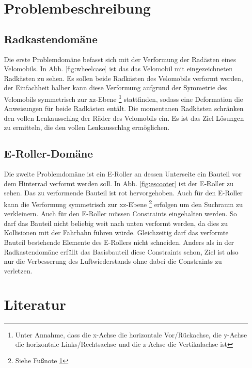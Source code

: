 \documentclass[12pt]{article}
\begin{document}
\section{Problembeschreibung}

\subsection{Radkastendomäne}

Die erste Problemdomäne befasst sich mit der Verformung der Radästen eines Velomobils. 
In Abb. \ref{fig:wheelcase} ist das das Velomobil mit eingezeichneten Radkästen zu sehen.
Es sollen beide Radkästen des Velomobils verformt werden, der Einfachheit halber kann diese Verformung aufgrund der Symmetrie des Velomobils symmetrisch zur xz-Ebene
\footnote{\label{foot:coords} Unter Annahme, dass die x-Achse die horizontale Vor/Rückachse, die y-Achse die horizontale Links/Rechtsachse und die z-Achse die Vertikalachse ist} stattfinden, sodass eine Deformation die Anweisungen für beide Radkästen entält.
Die momentanen Radkästen schränken den vollen Lenkausschlag der Räder des Velomobils ein.
Es ist das Ziel Lösungen zu ermitteln, die den vollen Lenkausschlag ermöglichen.
                      
\subsection{E-Roller-Domäne}

Die zweite Problemdomäne ist ein E-Roller an dessen Unterseite ein Bauteil vor dem Hinterrad verformt werden soll.
In Abb. \ref{fig:escooter} ist der E-Roller zu sehen. Das zu verformende Bauteil ist rot hervorgehoben.
Auch für den E-Roller kann die Verformung symmetrisch zur xz-Ebene \footnote{Siehe Fußnote \ref{foot:coords}} erfolgen um den Suchraum zu verkleinern.
Auch für den E-Roller müssen Constraints eingehalten werden. 
So darf das Bauteil nicht beliebig weit nach unten verformt werden, da dies zu Kollisionen mit der Fahrbahn führen würde.
Gleichzeitig darf das verformte Bauteil bestehende Elemente des E-Rollers nicht schneiden.
Anders als in der Radkastendomäne erfüllt das Basisbauteil diese Constraints schon, Ziel ist also nur die Verbesserung des Luftwiederstands ohne dabei die Constraints zu verletzen.
 
\section{Literatur}
\end{document}

